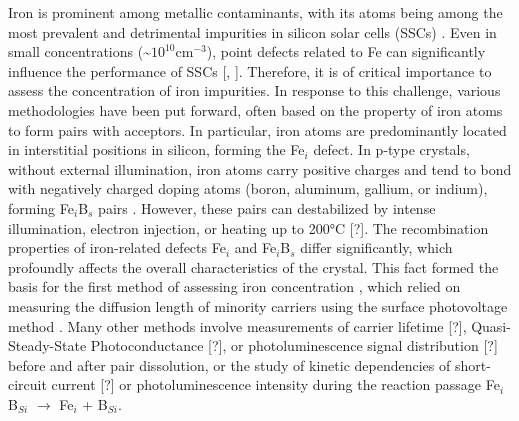 \documentclass[a4paper,fleqn]{cas-sc}
\begin{document}
Iron is prominent among metallic contaminants, with its atoms being among the most prevalent and detrimental impurities in silicon solar cells (SSCs) \cite{Buonassisi2006}. Even in small concentrations (\textasciitilde{}$\mathrm{10}^{10}$$\mathrm{cm}^{-3}$), point defects related to Fe can significantly influence the performance of SSCs [\cite{Schubert2015}, \cite{Herguth2022}]. Therefore, it is of critical importance to assess the concentration of iron impurities. In response to this challenge, various methodologies have been put forward, often based on the property of iron atoms to form pairs with acceptors. In particular, iron atoms are predominantly located in interstitial positions in silicon, forming the Fe$_i$ defect. In p-type crystals, without external illumination, iron atoms carry positive charges and tend to bond with negatively charged doping atoms (boron, aluminum, gallium, or indium), forming Fe$_i$B$_s$ pairs \cite{Kimerling1983}. However, these pairs can destabilized by intense illumination, electron injection, or heating up to 200°C [?]. The recombination properties of iron-related defects Fe$_i$ and Fe$_i$B$_s$ differ significantly, which profoundly affects the overall characteristics of the crystal. This fact formed the basis for the first method of assessing iron concentration \cite{Zoth1990}, which relied on measuring the diffusion length of minority carriers using the surface photovoltage method \cite{Tousek2008}. Many other methods involve measurements of carrier lifetime [?], Quasi-Steady-State Photoconductance [?], or photoluminescence signal distribution [?] before and after pair dissolution, or the study of kinetic dependencies of short-circuit current [?] or photoluminescence intensity during the reaction passage Fe$_i$B$_{Si}$ $\rightarrow$ Fe$_i$ + B$_{Si}$.
\end{document}
